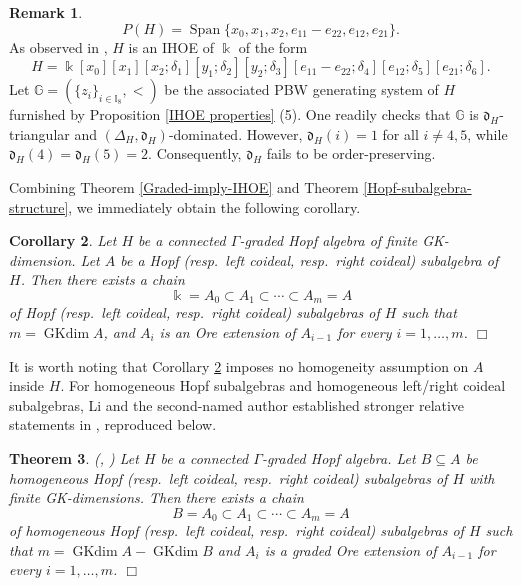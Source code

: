 \documentclass{article}
\theoremstyle{plain}
\newtheorem{thm}{Theorem}[section]
\newtheorem{corollary}[thm]{Corollary}
\theoremstyle{definition}
\newtheorem{remark}[thm]{Remark}
\numberwithin{equation}{section}
\DeclareMathOperator{\Span}{Span}
\DeclareMathOperator{\GKdim}{GKdim}
\newcommand{\GG}{\mathbb{G}}
\newcommand{\II}{\mathbb{I}}
\newcommand{\dd}{\mathfrak{d}}
\begin{document}
\begin{remark}
		\[
		P(H)=\Span\{ x_{0}, x_{1}, x_{2}, e_{11}-e_{22}, e_{12}, e_{21}  \}.
		\]
		As observed in \cite[Remark 4.6]{HW26}, $H$ is an IHOE of $\Bbbk$ of the form
		\[
		H= \Bbbk[x_0][x_1][x_2;\delta_1][y_1;\delta_2][y_2;\delta_3]
		[e_{11}-e_{22};\delta_4][e_{12};\delta_5][e_{21};\delta_6].
		\]
		Let $\GG=(\{z_{i}\}_{i\in \II_{8}}, <)$ be the associated PBW generating system of $H$ furnished by Proposition \ref{IHOE properties} (5). One readily checks that $\GG$ is $\dd_{H}$-triangular and $(\Delta_{H}, \dd_{H})$-dominated. However, $\dd_{H}(i)= 1$ for all $i\neq 4,5$, while $\dd_{H}(4) = \dd_{H}(5)=2$. Consequently, $\dd_{H}$ fails to be order-preserving.
	\end{remark}
	
	Combining Theorem \ref{Graded-imply-IHOE} and Theorem \ref{Hopf-subalgebra-structure}, we immediately obtain the following corollary.
	
	\begin{corollary}\label{coideal-structure-homo}
		Let $H$ be a connected $\Gamma$-graded Hopf algebra of finite GK-dimension. Let $A$ be a Hopf (resp.\ left coideal, resp.\ right coideal) subalgebra of $H$. Then there exists a chain
		\[
		\Bbbk =A_{0} \subset A_{1} \subset \cdots \subset A_{m} =A
		\]
		of Hopf (resp.\ left coideal, resp.\ right coideal) subalgebras of $H$
		such that $m=\GKdim A$, and $A_{i}$ is an Ore extension of $A_{i-1}$ for every $i=1,\ldots, m$.  \hfill $\Box$
	\end{corollary}
	
	It is worth noting that Corollary \ref{coideal-structure-homo} imposes no homogeneity assumption on $A$ inside $H$. For  homogeneous Hopf subalgebras and  homogeneous left/right coideal subalgebras, Li and the second-named author established stronger relative statements in \cite{LZ23,Zh24}, reproduced below.
	
	\begin{thm}(\cite[Theorem B]{LZ23}, \cite[Theorem B]{Zh24}) \label{coideal-structure-homo-relative}
		Let $H$ be a connected $\Gamma$-graded Hopf algebra. Let $B\subseteq A$ be homogeneous Hopf (resp.\ left coideal, resp.\ right coideal) subalgebras of $H$ with finite GK-dimensions. Then there exists a chain
		\[
		B =A_{0} \subset A_{1} \subset \cdots \subset A_{m} =A
		\]
		of homogeneous Hopf (resp.\ left coideal, resp.\ right coideal) subalgebras of $H$
		such that $m=\GKdim A-\GKdim B$ and $A_{i}$ is a graded Ore extension of $A_{i-1}$ for every $i=1,\ldots, m$. \hfill $\Box$
	\end{thm}
	
\end{document}
